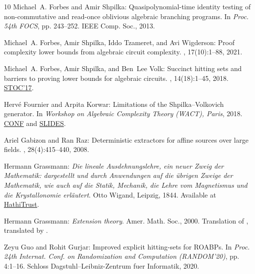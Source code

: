 \begin{thebibliography}{10}
{\sc Michael~A. Forbes and Amir Shpilka}: Quasipolynomial-time identity testing
  of non-commutative and read-once oblivious algebraic branching programs.
\newblock In {\em Proc. 54th FOCS}, pp. 243--252. IEEE Comp. Soc., 2013.

{\sc Michael~A. Forbes, Amir Shpilka, Iddo Tzameret, and Avi Wigderson}: Proof
  complexity lower bounds from algebraic circuit complexity.
, 17(10):1--88, 2021.

{\sc Michael~A. Forbes, Amir Shpilka, and Ben~Lee Volk}: Succinct hitting sets
  and barriers to proving lower bounds for algebraic circuits.
, 14(18):1--45, 2018.
\newblock \prelim \href{https://doi.org/10.1145/3055399.3055496}{STOC'17}.

{\sc Herv\'{e} Fournier and Arpita Korwar}: Limitations of the
  {Shpilka--Volkovich} generator.
\newblock In {\em Workshop on Algebraic Complexity Theory {(WACT)}, Paris},
  2018.
\newblock \href{http://wact.imj-prg.fr}{CONF} and
  \href{http://wact.imj-prg.fr/pdfs/slides-korwar.pdf}{SLIDES}.

{\sc Ariel Gabizon and Ran Raz}: Deterministic extractors for affine sources
  over large fields.
, 28(4):415–440, 2008.
\newblock [\epfmtdoi{10.1007/s00493-008-2259-3}]

{\sc Hermann Grassmann}: {\em {Die lineale Ausdehnungslehre, ein neuer Zweig
  der Mathematik: dargestellt und durch Anwendungen auf die {\"u}brigen Zweige
  der Mathematik, wie auch auf die Statik, Mechanik, die Lehre vom Magnetismus
  und die Krystallonomie erl{\"a}utert}}.
\newblock Otto Wigand, Leipzig, 1844.
\newblock Available at
  \href{https://babel.hathitrust.org/cgi/pt?id=nyp.33433017485941&seq=11}{HathiTrust}.

{\sc Hermann Grassmann}: {\em Extension theory}.
\newblock Amer. Math. Soc., 2000.
\newblock Translation of \cite{Grassmann1844}, translated by {}.

{\sc Zeyu Guo and Rohit Gurjar}: Improved explicit hitting-sets for {ROABPs}.
\newblock In {\em Proc. 24th Internat. Conf. on Randomization and Computation
  (RANDOM'20)}, pp. 4:1--16. Schloss Dagstuhl--Leibniz-Zentrum fuer Informatik,
  2020.


\end{thebibliography}
